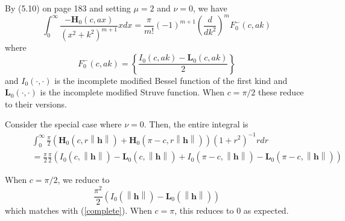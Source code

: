 \documentclass[11pt]{article}
\newcommand{\rh}{r\left\lVert \boldsymbol{h}\right\rVert}
\begin{document}
%  

\pagebreak


By (5.10) on page 183 and setting $\mu = 2$ and $\nu = 0$, we have $$\int_0^\infty \frac{-\boldsymbol{H}_{0}(c, ax)}{(x^2 + k^2)^{m+1}}x dx = \frac{\pi}{m!} (-1)^{m+1} \left(\frac{d}{dk^2}\right)^{m} F_0^-(c, ak)$$where $$F_0^-(c, ak)=\left\{\frac{I_{0}(c, ak) - \boldsymbol{L}_0(c, ak)}{2}\right\}$$and $I_0(\cdot, \cdot)$ is the incomplete modified Bessel function of the first kind and $\boldsymbol{L}_0(\cdot, \cdot)$ is the incomplete modified Struve function. When $c=  \pi/2$ these reduce to their  versions. %

Consider the special case where $\nu = 0$. Then, the entire integral is \begin{align*}
&\int_0^\infty\frac{\pi}{2} \left(\boldsymbol{H}_{0}(c, r\left\lVert \boldsymbol{h}\right\rVert) + \boldsymbol{H}_{0}(\pi - c, r\left\lVert \boldsymbol{h}\right\rVert)\right) (1 + r^2)^{-1} r dr \\
\ \ \ \ \ \ \ \ \ &= \frac{\pi}{2} \frac{\pi}{2}\left( I_0(c, \left\lVert \boldsymbol{h}\right\rVert) - \boldsymbol{L}_0(c,\left\lVert \boldsymbol{h}\right\rVert) + I_0(\pi - c, \left\lVert \boldsymbol{h}\right\rVert) - \boldsymbol{L}_0(\pi - c,\left\lVert \boldsymbol{h}\right\rVert)\right)
\end{align*}

When $c = \pi/2$, we reduce to $$\frac{\pi^2}{2} \left( I_0(\left\lVert \boldsymbol{h}\right\rVert) - \boldsymbol{L}_0(\left\lVert \boldsymbol{h}\right\rVert) \right)$$which matches with (\ref{complete}). When $c = \pi$, this reduces to $0$ as expected. 

\end{document}
